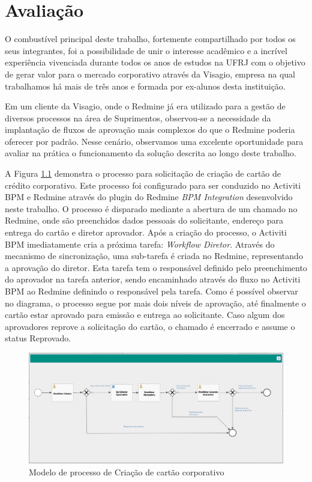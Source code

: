 \chapter{Avaliação}\label{chp:conclusao}

O combustível principal deste trabalho, fortemente compartilhado por todos os seus integrantes, foi a possibilidade de unir o interesse acadêmico e a incrível experiência vivenciada durante todos os anos de estudos na UFRJ com o objetivo de gerar valor para o mercado corporativo através da Visagio\cite{visagio}, empresa na qual trabalhamos há mais de três anos e formada por ex-alunos desta instituição.

Em um cliente da Visagio, onde o Redmine já era utilizado para a gestão de diversos processos na área de Suprimentos, observou-se a necessidade da implantação de fluxos de aprovação mais complexos do que o Redmine poderia oferecer por padrão. Nesse cenário, observamos uma excelente oportunidade para avaliar na prática o funcionamento da solução descrita ao longo deste trabalho.

A Figura \ref{fig:process_cartao_compras} demonstra o processo para solicitação de criação de cartão de crédito corporativo. Este processo foi configurado para ser conduzido no Activiti BPM e Redmine através do plugin do Redmine \textit{BPM Integration} desenvolvido neste trabalho. O processo é disparado mediante a abertura de um chamado no Redmine, onde são preenchidos dados pessoais do solicitante, endereço para entrega do cartão e diretor aprovador. Após a criação do processo, o Activiti BPM imediatamente cria a próxima tarefa: \textit{Workflow Diretor}. Através do mecanismo de sincronização, uma sub-tarefa é criada no Redmine, representando a aprovação do diretor. Esta tarefa tem o responsável definido pelo preenchimento do aprovador na tarefa anterior, sendo encaminhado através do fluxo no Activiti BPM ao Redmine definindo o responsável pela tarefa. Como é possível observar no diagrama, o processo segue por mais dois níveis de aprovação, até finalmente o cartão estar aprovado para emissão e entrega ao solicitante. Caso algum dos aprovadores reprove a solicitação do cartão, o chamado é encerrado e assume o status Reprovado.

\begin{figure}[H]
\centering
\includegraphics[width=1\textwidth]{imagens/processo_cartao_compras.png}
\caption{Modelo de processo de Criação de cartão corporativo}
\label{fig:process_cartao_compras}
\end{figure}


